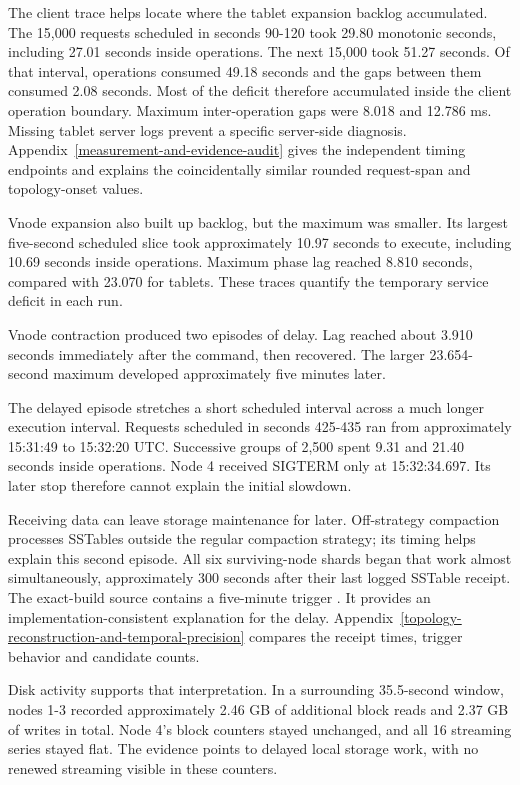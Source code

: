 The client trace helps locate where the tablet expansion backlog accumulated. The 15,000 requests scheduled in seconds 90-120 took 29.80 monotonic seconds, including 27.01 seconds inside operations. The next 15,000 took 51.27 seconds. Of that interval, operations consumed 49.18 seconds and the gaps between them consumed 2.08 seconds. Most of the deficit therefore accumulated inside the client operation boundary. Maximum inter-operation gaps were 8.018 and 12.786 ms. Missing tablet server logs prevent a specific server-side diagnosis. Appendix~\ref{measurement-and-evidence-audit} gives the independent timing endpoints and explains the coincidentally similar rounded request-span and topology-onset values.

Vnode expansion also built up backlog, but the maximum was smaller. Its largest five-second scheduled slice took approximately 10.97 seconds to execute, including 10.69 seconds inside operations. Maximum phase lag reached 8.810 seconds, compared with 23.070 for tablets. These traces quantify the temporary service deficit in each run.

Vnode contraction produced two episodes of delay. Lag reached about 3.910 seconds immediately after the command, then recovered. The larger 23.654-second maximum developed approximately five minutes later.

The delayed episode stretches a short scheduled interval across a much longer execution interval. Requests scheduled in seconds 425-435 ran from approximately 15:31:49 to 15:32:20 UTC. Successive groups of 2,500 spent 9.31 and 21.40 seconds inside operations. Node 4 received SIGTERM only at 15:32:34.697. Its later stop therefore cannot explain the initial slowdown.

Receiving data can leave storage maintenance for later. Off-strategy compaction processes SSTables outside the regular compaction strategy; its timing helps explain this second episode. All six surviving-node shards began that work almost simultaneously, approximately 300 seconds after their last logged SSTable receipt. The exact-build source contains a five-minute trigger \cite{r15,r16}. It provides an implementation-consistent explanation for the delay. Appendix~\ref{topology-reconstruction-and-temporal-precision} compares the receipt times, trigger behavior and candidate counts.

Disk activity supports that interpretation. In a surrounding 35.5-second window, nodes 1-3 recorded approximately 2.46 GB of additional block reads and 2.37 GB of writes in total. Node 4's block counters stayed unchanged, and all 16 streaming series stayed flat. The evidence points to delayed local storage work, with no renewed streaming visible in these counters.

